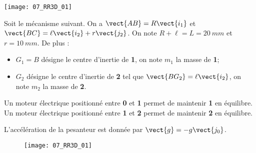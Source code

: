 \normalfalse \difficiletrue \tdifficilefalse
\correctionfalse


\setcounter{question}{0}%

\ifcorrection
\else
{}
\fi

\ifprof

\begin{marginfigure}
\centering
\texttt{[image: 07\_RR3D\_01]}
\end{marginfigure}
\else
Soit le mécanisme suivant. On a $\vect{AB}=R\vect{i_1}$ et $\vect{BC}=\ell\vect{i_2}+r\vect{j_2}$. On note $R+\ell=L = \SI{20}{mm}$ et $r=\SI{10}{mm}$. De plus :
\begin{itemize}
\item $G_1=B$ désigne le centre d'inertie de \textbf{1}, on note $m_1$ la masse de \textbf{1};%
\item $G_2$ désigne le centre d'inertie de \textbf{2} tel que  $\vect{BG_2}=\ell\vect{i_2}$, on note $m_2$ la masse de \textbf{2}.%
\end{itemize}

Un moteur électrique positionné entre \textbf{0} et \textbf{1} permet de maintenir \textbf{1} en équilibre.
Un moteur électrique positionné entre \textbf{1} et \textbf{2} permet de maintenir \textbf{2} en équilibre.

L'accélération de la pesanteur est donnée par $\vect{g}=-g\vect{j_0}$.

\begin{figure}[!h]
\centering
\texttt{[image: 07\_RR3D\_01]}
\end{figure}
\fi

\ifprof
\else
\fi

\ifprof
\else
\fi

\ifprof
\else
\fi

\ifprof
\else


\fi